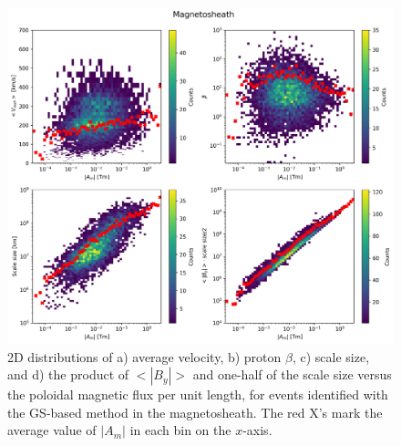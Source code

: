 \begin{figure}[ht!]
    \centering
    \includegraphics[width=\textwidth]{Figures/GS analysis/heatmap_magnetosheath.png}
    \caption[2D distributions of various parameters vs. $|A_m|$ in the magnetosheath]{2D distributions of a) average velocity, b) proton $\beta$, c) scale size, and d) the product of $<|B_y|>$ and one-half of the scale size versus the poloidal magnetic flux per unit length, for events identified with the GS-based method in the magnetosheath. The red X's mark the average value of $|A_m|$ in each bin on the $x$-axis.}
    \label{fig:heatmap-magntosheath}
\end{figure}

